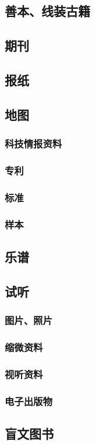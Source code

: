\documentclass[UTF8]{../../ApplicationUniverse}
\begin{document}
\subsection{善本、线装古籍}
\subsection{期刊}
\subsection{报纸}
\subsection{地图}
    \subsubsection{科技情报资料}
    \subsubsection{专利}
    \subsubsection{标准}
    \subsubsection{样本}
\subsection{乐谱}
\subsection{试听}
    \subsubsection{图片、照片}
    \subsubsection{缩微资料}
    \subsubsection{视听资料}
    \subsubsection{电子出版物}
\subsection{盲文图书}
\end{document}
